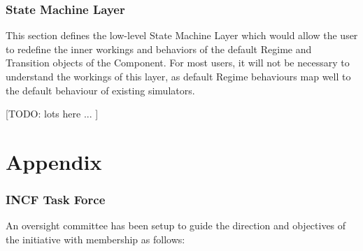 \documentclass[a4paper]{article}
\begin{document}
\section{State Machine Layer}

This section defines the low-level State Machine Layer which would
allow the user to redefine the inner workings and behaviors of the
default Regime and Transition objects of the Component.  For most
users, it will not be necessary to understand the workings of this
layer, as default Regime behaviours map well to the default behaviour
of existing simulators.

[TODO: lots here ... ]



\newpage


\appendix


\part*{Appendix}

\section{INCF Task Force}

An oversight committee has been setup to guide the direction and
objectives of the initiative with membership as follows:
\end{document}
